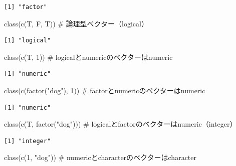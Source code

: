 \documentclass[
  letterpaper,
  DIV=11,
  numbers=noendperiod]{scrreprt}
\newenvironment{Shaded}{\begin{snugshade}}{\end{snugshade}}
\newcommand{\CommentTok}[1]{\textcolor[rgb]{0.37,0.37,0.37}{#1}}
\newcommand{\DecValTok}[1]{\textcolor[rgb]{0.68,0.00,0.00}{#1}}
\newcommand{\FunctionTok}[1]{\textcolor[rgb]{0.28,0.35,0.67}{#1}}
\newcommand{\NormalTok}[1]{\textcolor[rgb]{0.00,0.23,0.31}{#1}}
\newcommand{\StringTok}[1]{\textcolor[rgb]{0.13,0.47,0.30}{#1}}
\begin{document}
\begin{verbatim}
[1] "factor"
\end{verbatim}

\begin{Shaded}
\begin{Highlighting}[]
\FunctionTok{class}\NormalTok{(}\FunctionTok{c}\NormalTok{(T, F, T)) }\CommentTok{\# 論理型ベクター（logical）}
\end{Highlighting}
\end{Shaded}

\begin{verbatim}
[1] "logical"
\end{verbatim}

\begin{Shaded}
\begin{Highlighting}[]
\FunctionTok{class}\NormalTok{(}\FunctionTok{c}\NormalTok{(T, }\DecValTok{1}\NormalTok{)) }\CommentTok{\# logicalとnumericのベクターはnumeric}
\end{Highlighting}
\end{Shaded}

\begin{verbatim}
[1] "numeric"
\end{verbatim}

\begin{Shaded}
\begin{Highlighting}[]
\FunctionTok{class}\NormalTok{(}\FunctionTok{c}\NormalTok{(}\FunctionTok{factor}\NormalTok{(}\StringTok{"dog"}\NormalTok{), }\DecValTok{1}\NormalTok{)) }\CommentTok{\# factorとnumericのベクターはnumeric}
\end{Highlighting}
\end{Shaded}

\begin{verbatim}
[1] "numeric"
\end{verbatim}

\begin{Shaded}
\begin{Highlighting}[]
\FunctionTok{class}\NormalTok{(}\FunctionTok{c}\NormalTok{(T, }\FunctionTok{factor}\NormalTok{(}\StringTok{"dog"}\NormalTok{))) }\CommentTok{\# logicalとfactorのベクターはnumeric（integer）}
\end{Highlighting}
\end{Shaded}

\begin{verbatim}
[1] "integer"
\end{verbatim}

\begin{Shaded}
\begin{Highlighting}[]
\FunctionTok{class}\NormalTok{(}\FunctionTok{c}\NormalTok{(}\DecValTok{1}\NormalTok{, }\StringTok{"dog"}\NormalTok{)) }\CommentTok{\# numericとcharacterのベクターはcharacter}
\end{Highlighting}
\end{Shaded}
\end{document}
